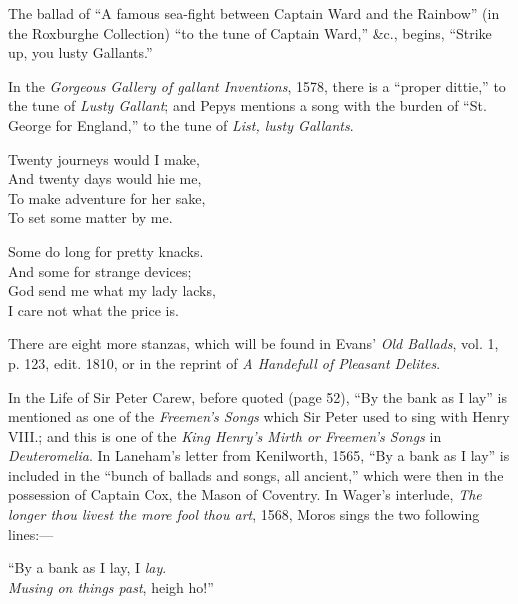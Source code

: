 The ballad of “A famous sea-fight between Captain Ward and the Rainbow”
(in the Roxburghe Collection) “to the tune of Captain Ward,” \&c., begins, “Strike
up, you lusty Gallants.”

In the \textit{Gorgeous Gallery of gallant Inventions}, 1578, there is a “proper dittie,”
to the tune of \textit{Lusty Gallant}; and Pepys mentions a song with the burden of
“St. George for England,” to the tune of \textit{List, lusty Gallants}.


\smallskip



\settowidth{\versewidth}{Twenty journeys would I make,}
\begin{dcverse}
\begin{altverse}
Twenty journeys would I make,\\
And twenty days would hie me,\\
To make adventure for her sake,\\
To set some matter by me.
\end{altverse}

\begin{altverse}
Some do long for pretty knacks.\\
And some for strange devices;\\
God send me what my lady lacks,\\
I care not what the price is.
\end{altverse}
\end{dcverse}

There are eight more stanzas, which will be found in Evans’ \textit{Old Ballads}, vol. 1,
p. 123, edit. 1810, or in the reprint of \textit{A Handefull of Pleasant Delites}.


In the Life of Sir Peter Carew, before quoted (page 52), “By the bank as
I lay” is mentioned as one of the \textit{Freemen’s Songs} which Sir Peter used to sing
with Henry VIII.; and this is one of the \textit{King Henry’s Mirth or Freemen’s Songs}
in \textit{Deuteromelia}. In Laneham’s letter from Kenilworth, 1565, “By a bank as
I lay” is included in the “bunch of ballads and songs, all ancient,” which were
then in the possession of Captain Cox, the Mason of Coventry. In Wager’s interlude, 
\textit{The longer thou livest the more fool thou art}, 1568, Moros sings the two
following lines:—
\begin{scverse}
“By a bank as I lay, I \textit{lay}.\\
\textit{Musing on things past}, heigh ho!”
\end{scverse}

